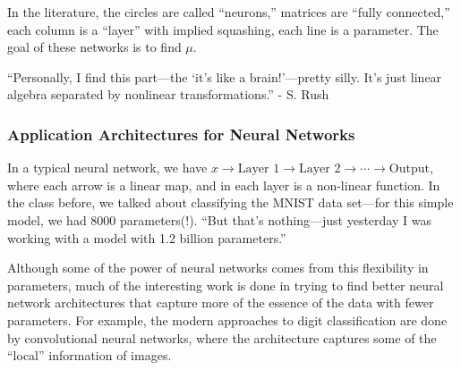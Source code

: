 \documentclass{article}
\begin{document}
In the literature, the circles are called ``neurons,'' matrices are ``fully connected,'' each column is a ``layer'' with implied squashing, each line is a parameter. The goal of these networks is to find $\mu$.

``Personally, I find this part---the `it's like a brain!'---pretty silly. It's just linear algebra separated by nonlinear transformations.'' - S. Rush

\subsubsection{Application Architectures for Neural Networks}

In a typical neural network, we have $x\to\text{Layer 1}\to\text{Layer 2}\to\cdots\to\text{Output}$, where each arrow is a linear map, and in each layer is a non-linear function. In the class before, we talked about classifying the MNIST data set---for this simple model, we had 8000 parameters(!). ``But that's nothing---just yesterday I was working with a model with 1.2 billion parameters.''

Although some of the power of neural networks comes from this flexibility in parameters, much of the interesting work is done in trying to find better neural network architectures that capture more of the essence of the data with fewer parameters. For example, the modern approaches to digit classification are done by convolutional neural networks, where the architecture captures some of the ``local'' information of images.
\end{document}
